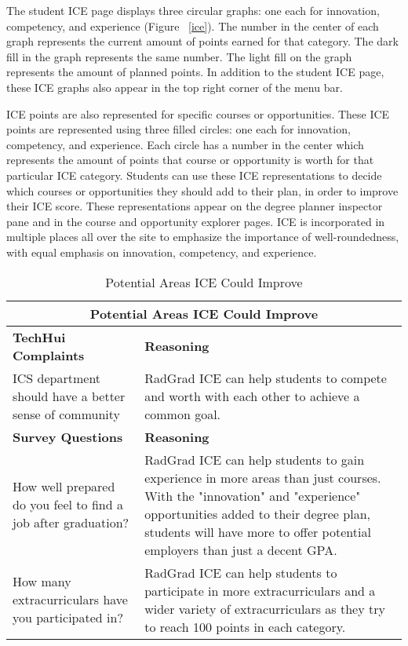 The student ICE page displays three circular graphs: one each for innovation, competency, and experience (Figure ~\ref{ice}). The number in the center of each graph represents the current amount of points earned for that category. The dark fill in the graph represents the same number. The light fill on the graph represents the amount of planned points. In addition to the student ICE page, these ICE graphs also appear in the top right corner of the menu bar. 

ICE points are also represented for specific courses or opportunities. These ICE points are represented using three filled circles: one each for innovation, competency, and experience. Each circle has a number in the center which represents the amount of points that course or opportunity is worth for that particular ICE category. Students can use these ICE representations to decide which courses or opportunities they should add to their plan, in order to improve their ICE score. These representations appear on the degree planner inspector pane and in the course and opportunity explorer pages. ICE is incorporated in multiple places all over the site to emphasize the importance of well-roundedness, with equal emphasis on innovation, competency, and experience.

\begin{table}[htbp!]
\centering
\begin{tabular}{  |p{4cm}|p{12cm}| } 
\hline
 \multicolumn{2}{|c|}{Potential Areas ICE Could Improve}\\
  \hline
 \textbf{TechHui Complaints} & \textbf{Reasoning} \\ 
  \hline
  ICS department should have a better sense of community & RadGrad ICE can help students to compete and worth with each other to achieve a common goal.\\
  \hline
 \textbf{Survey Questions} & \textbf{Reasoning} \\ 
  \hline
  How well prepared do you feel to find a job after graduation? & RadGrad ICE can help students to gain experience in more areas than just courses. With the "innovation" and "experience" opportunities added to their degree plan, students will have more to offer potential employers than just a decent GPA.\\
  \hline
    How many extracurriculars have you participated in? & RadGrad ICE can help students to participate in more extracurriculars and a wider variety of extracurriculars as they try to reach 100 points in each category. \\
  \hline
\end{tabular}
 \caption{Potential Areas ICE Could Improve}
\end{table}

